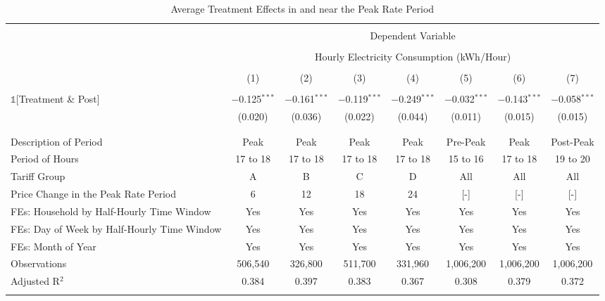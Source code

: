 
\begin{table}[!htbp] \centering 
  \caption{Average Treatment Effects in and near the Peak Rate Period} 
  \label{Table:Average-Treatment-Effects-in-and-near-the-Peak-Rate-Period} 
\small 
\begin{tabular}{@{\extracolsep{1pt}}lccccccc} 
\\[-1.8ex]\hline 
\hline \\[-1.8ex] 
 & \multicolumn{7}{c}{Dependent Variable} \\ 
\cline{2-8} 
\\[-1.8ex] & \multicolumn{7}{c}{Hourly Electricity Consumption  (kWh/Hour)} \\ 
\\[-1.8ex] & (1) & (2) & (3) & (4) & (5) & (6) & (7)\\ 
\hline \\[-1.8ex] 
 $\mathbb{1}$[Treatment \& Post] & $-$0.125$^{***}$ & $-$0.161$^{***}$ & $-$0.119$^{***}$ & $-$0.249$^{***}$ & $-$0.032$^{***}$ & $-$0.143$^{***}$ & $-$0.058$^{***}$ \\ 
  & (0.020) & (0.036) & (0.022) & (0.044) & (0.011) & (0.015) & (0.015) \\ 
  & & & & & & & \\ 
\hline \\[-1.8ex] 
Description of Period & Peak & Peak & Peak & Peak & Pre-Peak & Peak & Post-Peak \\ 
Period of Hours & 17 to 18 & 17 to 18 & 17 to 18 & 17 to 18 & 15 to 16 & 17 to 18 & 19 to 20 \\ 
Tariff Group & A & B & C & D & All & All & All \\ 
Price Change in the Peak Rate Period & 6 & 12 & 18 & 24 & [-] & [-] & [-] \\ 
FEs: Household by Half-Hourly Time Window & Yes & Yes & Yes & Yes & Yes & Yes & Yes \\ 
FEs: Day of Week by Half-Hourly Time Window & Yes & Yes & Yes & Yes & Yes & Yes & Yes \\ 
FEs: Month of Year & Yes & Yes & Yes & Yes & Yes & Yes & Yes \\ 
Observations & 506,540 & 326,800 & 511,700 & 331,960 & 1,006,200 & 1,006,200 & 1,006,200 \\ 
Adjusted R$^{2}$ & 0.384 & 0.397 & 0.383 & 0.367 & 0.308 & 0.379 & 0.372 \\ 
\hline 
\hline \\[-1.8ex] 
\end{tabular} 
\end{table} 
